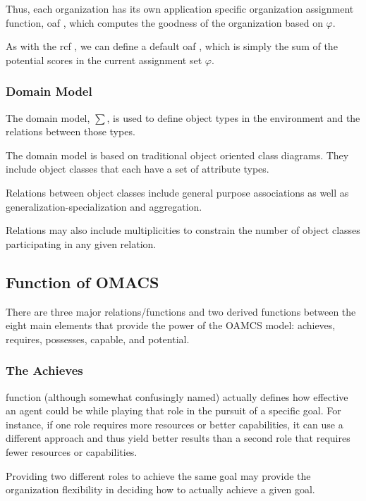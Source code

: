 Thus, each organization has its own application specific organization assignment function, oaf , which computes the goodness of the organization based on $\varphi$. 
	
As with the rcf , we can define a default  oaf , which is simply the sum of the potential scores in the current assignment set $\varphi$.
                     
 
\subsubsection{ Domain Model } 

The domain model, $\sum$, is used to define object types in the environment 
and the relations between those types. \cite{omacs2}

The domain model is based on traditional object oriented class diagrams. They
include object classes that each have a set of attribute types. 

Relations between object classes include general purpose associations
 as well as generalization-specialization and aggregation.
 
Relations may also include multiplicities to constrain the number of object classes participating in
any given relation.\cite{omacs2}
 






 
\subsection{ Function of OMACS }

There are three major relations/functions and two derived functions between the eight main elements that provide the power of the OAMCS model: achieves, requires, possesses, capable, and potential. 
\subsubsection{The Achieves}
function (although somewhat confusingly named) actually defines how effective an agent could be while playing that role in the pursuit of a specific goal. For instance, if one role requires more resources or better capabilities, it can use a different approach and thus yield better results than a second role that requires fewer resources or capabilities. \cite{omacs4}

 Providing two different roles to achieve the same goal  may provide the organization flexibility in deciding how to actually achieve a given goal.

